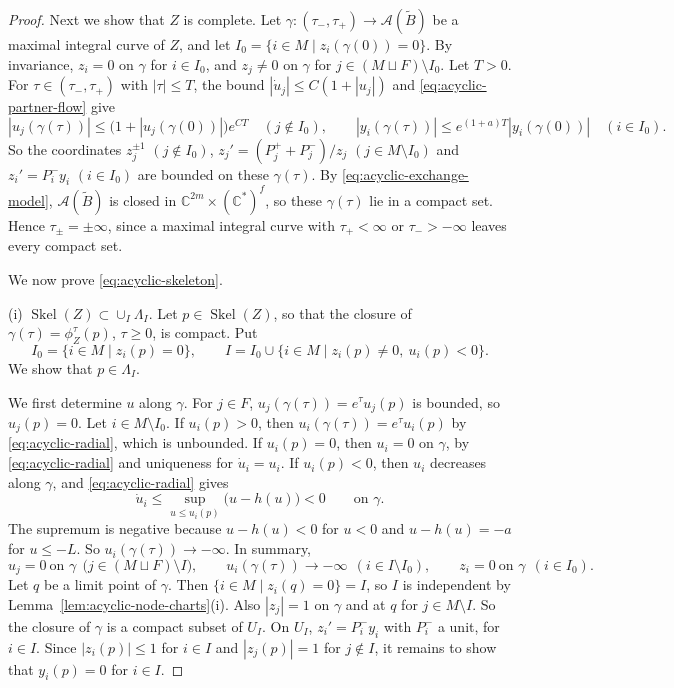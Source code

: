 \documentclass[11pt,a4paper]{article}
\newcommand{\cA}{\mathcal A}\newcommand{\sA}{\mathcal A}
\newcommand{\bC}{\mathbb C}\newcommand{\bR}{\mathbb R}\newcommand{\bZ}{\mathbb Z}
\DeclareMathOperator{\Skel}{Skel}\DeclareMathOperator{\Log}{Log}
\begin{document}
\begin{proof}
Next we show that $Z$ is complete.
Let $\gamma\colon(\tau_-,\tau_+)\to\cA(\widetilde B)$ be a maximal integral curve of $Z$, and let $I_0=\{i\in M\mid z_i(\gamma(0))=0\}$.
By invariance, $z_i=0$ on $\gamma$ for $i\in I_0$, and $z_j\ne0$ on $\gamma$ for $j\in(M\sqcup F)\setminus I_0$.
Let $T>0$.
For $\tau\in(\tau_-,\tau_+)$ with $|\tau|\le T$, the bound $|\dot u_j|\le C(1+|u_j|)$ and \eqref{eq:acyclic-partner-flow} give
\[
 |u_j(\gamma(\tau))|\le\bigl(1+|u_j(\gamma(0))|\bigr)e^{CT}\quad(j\notin I_0),\qquad
 |y_i(\gamma(\tau))|\le e^{(1+a)T}|y_i(\gamma(0))|\quad(i\in I_0).
\]
So the coordinates $z_j^{\pm1}$ $(j\notin I_0)$, $z_j'=(P_j^++P_j^-)/z_j$ $(j\in M\setminus I_0)$ and $z_i'=P_i^-y_i$ $(i\in I_0)$ are bounded on these $\gamma(\tau)$.
By \eqref{eq:acyclic-exchange-model}, $\cA(\widetilde B)$ is closed in $\bC^{2m}\times(\bC^*)^f$, so these $\gamma(\tau)$ lie in a compact set.
Hence $\tau_\pm=\pm\infty$, since a maximal integral curve with $\tau_+<\infty$ or $\tau_->-\infty$ leaves every compact set.

We now prove \eqref{eq:acyclic-skeleton}.

(i) \(\Skel(Z) \subset \cup_I \Lambda_I\).
Let $p\in\Skel(Z)$, so that the closure of $\gamma(\tau)=\phi_Z^\tau(p)$, $\tau\ge0$, is compact.
Put
\[
 I_0=\{i\in M\mid z_i(p)=0\},\qquad I=I_0\cup\{i\in M\mid z_i(p)\ne0,\ u_i(p)<0\}.
\]
We show that $p\in\Lambda_I$.

We first determine $u$ along $\gamma$.
For $j\in F$, $u_j(\gamma(\tau))=e^\tau u_j(p)$ is bounded, so $u_j(p)=0$.
Let $i\in M\setminus I_0$.
If $u_i(p)>0$, then $u_i(\gamma(\tau))=e^\tau u_i(p)$ by \eqref{eq:acyclic-radial}, which is unbounded.
If $u_i(p)=0$, then $u_i=0$ on $\gamma$, by \eqref{eq:acyclic-radial} and uniqueness for $\dot u_i=u_i$.
If $u_i(p)<0$, then $u_i$ decreases along $\gamma$, and \eqref{eq:acyclic-radial} gives
\[
 \dot u_i\le\sup_{u\le u_i(p)}\bigl(u-h(u)\bigr)<0\qquad\text{on }\gamma .
\]
The supremum is negative because $u-h(u)<0$ for $u<0$ and $u-h(u)=-a$ for $u\le-L$.
So $u_i(\gamma(\tau))\to-\infty$.
In summary,
\[
 u_j=0\ \text{on }\gamma\ \ \bigl(j\in(M\sqcup F)\setminus I\bigr),\qquad
 u_i(\gamma(\tau))\to-\infty\ \ (i\in I\setminus I_0),\qquad
 z_i=0\ \text{on }\gamma\ \ (i\in I_0).
\]
Let $q$ be a limit point of $\gamma$.
Then $\{i\in M\mid z_i(q)=0\}=I$, so $I$ is independent by Lemma~\ref{lem:acyclic-node-charts}(i).
Also $|z_j|=1$ on $\gamma$ and at $q$ for $j\in M\setminus I$.
So the closure of $\gamma$ is a compact subset of $U_I$.
On $U_I$, $z_i'=P_i^-y_i$ with $P_i^-$ a unit, for $i\in I$.
Since $|z_i(p)|\le1$ for $i\in I$ and $|z_j(p)|=1$ for $j\notin I$, it remains to show that $y_i(p)=0$ for $i\in I$.


\end{proof}
\end{document}
